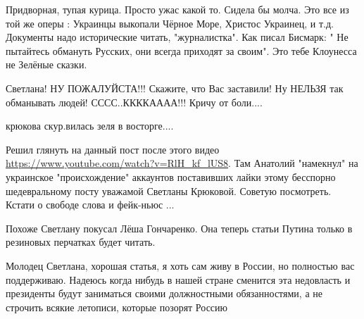 \begin{itemize}
Придворная, тупая курица. Просто ужас какой то. Сидела бы молча. Это все из той
же оперы : Украинцы выкопали Чёрное Море, Христос Украинец, и т.д. Документы
надо исторические читать, "журналистка". Как писал Бисмарк: " Не пытайтесь
обмануть Русских, они всегда приходят за своим". Это тебе Клоунесса не Зелёные
сказки.


 

Светлана! НУ ПОЖАЛУЙСТА!!! Скажите, что Вас заставили! Ну НЕЛЬЗЯ так обманывать
людей! СССС..ККККАААА!!! Кричу от боли....


 

крюкова скур.вилась зеля в восторге....

 

Решил глянуть на данный пост после этого видео
\url{https://www.youtube.com/watch?v=RlH_kf_lUS8}. Там Анатолий "намекнул" на
украинское "происхождение" аккаунтов поставивших лайки этому бесспорно
шедевральному посту уважамой Светланы Крюковой. Советую посмотреть. Кстати о
свободе слова и фейк-ньюс ...


 

Похоже Светлану покусал Лёша Гончаренко. Она теперь статьи Путина только в
резиновых перчатках будет читать.

 

Молодец Светлана, хорошая статья, я хоть сам живу в России, но полностью вас
поддерживаю. Надеюсь когда нибудь в нашей стране сменится эта недовласть и
президенты будут заниматься своими должностными обязанностями, а не строчить
всякие летописи, которые позорят Россию


\end{itemize}
